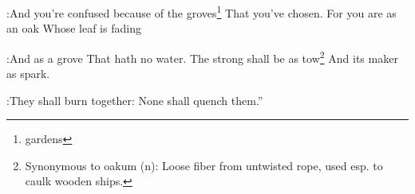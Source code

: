 \begin{inparaenum}
:And you're confused because of the groves\footnote{gardens} That you've chosen.%
     For you are as an oak Whose leaf is fading%

:And as a grove That hath no water.%
     The strong shall be as tow\footnote{Synonymous to oakum (n): Loose fiber from untwisted rope, used esp. to caulk wooden ships.} And its maker as spark.%

:They shall burn together: None shall quench them.''%
\end{inparaenum}
